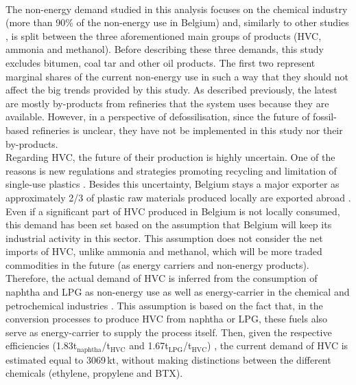\\

The non-energy demand studied in this analysis focuses on the chemical industry (more than 90\% of the non-energy use in Belgium) and, similarly to other studies \cite{IEA2018_petrochemicals, daioglou2014energy}, is split between the three aforementioned main groups of products (\ie \gls{HVC}, ammonia and methanol). Before describing these three demands, this study excludes bitumen, coal tar and \og other oil products\fg. The first two represent marginal shares of the current non-energy use in such a way that they should not affect the big trends provided by this study. As described previously, the latest are mostly by-products from refineries that the system uses because they are available. However, in a perspective of defossilisation, since the future of fossil-based refineries is unclear, they have not be implemented in this study nor their by-products.\\

Regarding \gls{HVC}, the future of their production is highly uncertain. One of the reasons is new regulations and strategies promoting recycling and limitation of single-use plastics \cite{EU_plastics}.  Besides this uncertainty, Belgium stays a major exporter as approximately 2/3 of plastic raw materials produced locally are exported abroad \cite{agoria_plastics}. Even if a significant part of \gls{HVC} produced in Belgium is not locally consumed, this demand has been set based on the assumption that Belgium will keep its industrial activity in this sector. This assumption does not consider the net imports of \gls{HVC}, unlike ammonia and methanol, which will be more traded commodities in the future (as energy carriers and non-energy products). Therefore, the actual demand of \gls{HVC} is inferred from the consumption of naphtha and \gls{LPG} as non-energy use as well as energy-carrier in the chemical and petrochemical industries \cite{statbel_NED_2019}. This assumption is based on the fact that, in the conversion processes to produce \gls{HVC} from naphtha or \gls{LPG}, these fuels also serve as energy-carrier to supply the process itself. Then, given the respective efficiencies (1.83t$_{\text{naphtha}}$/t$_{\text{HVC}}$ and 1.67t$_{\text{LPG}}$/t$_{\text{HVC}}$) \cite{IEA2018_petrochemicals}, the current demand of \gls{HVC} is estimated equal to 3069\,kt, without making distinctions between the different chemicals (\ie ethylene, propylene and \gls{BTX}). \\

